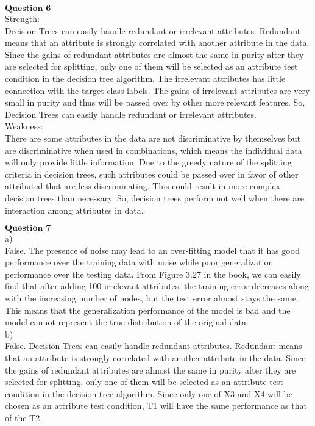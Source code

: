 \documentclass[12pt]{article}
\begin{document}
\newpage

$\textbf{Question 6}$\\

Strength: \\

Decision Trees can easily handle redundant or irrelevant attributes. Redundant means that an attribute is strongly correlated with another attribute in the data. Since the gains of redundant attributes are almost the same in purity after they are selected for splitting, only one of them will be selected as an attribute test condition in the decision tree algorithm. The irrelevant attributes has little connection with the target class labels. The gains of irrelevant attributes are very small in purity and thus will be passed over by other more relevant features. So, Decision Trees can easily handle redundant or irrelevant attributes.\\

Weakness:\\

There are some attributes in the data are not discriminative by themselves but are discriminative when used in combinations, which means the individual data will only provide little information. Due to the greedy nature of the splitting criteria in decision trees, such attributes could be passed over in favor of other attributed that
are less discriminating. This could result in more complex decision trees than necessary. So, decision trees perform not well when there are interaction among attributes in data.


\newpage

$\textbf{Question 7}$\\

a)\\

False. The presence of noise may lead to an over-fitting model that it has good performance over the training data with noise while poor generalization performance over the testing data. From Figure 3.27 in the book, we can easily find that after adding 100 irrelevant attributes, the training error decreases along with the increasing number of nodes, but the test error almost stays the same. This means that the generalization performance of the model is bad and the model cannot represent the true distribution of the original data.\\

b)\\

False. Decision Trees can easily handle redundant attributes. Redundant means that an attribute is strongly correlated with another attribute in the data. Since the gains of redundant attributes are almost the same in purity after they are selected for splitting, only one of them will be selected as an attribute test condition in the decision tree algorithm. Since only one of X3 and X4 will be chosen as an attribute test condition, T1 will have the same performance as that of the T2.\\
\end{document}
